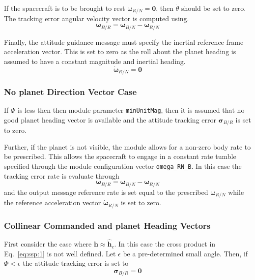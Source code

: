 If the spacecraft is to be brought to rest $\bm\omega_{R/N} = \bm 0$, then $\dot\theta$ should be set to zero.  The tracking error angular velocity vector is computed using.
\begin{equation}
	\label{eq:ssp:4}
	\bm\omega_{B/R} = \bm\omega_{B/N} - \bm\omega_{R/N}
\end{equation}

Finally, the attitude guidance message must specify the inertial reference frame  acceleration vector.  This is set to zero as the roll about the planet heading is assumed to have a constant magnitude and inertial heading.
\begin{equation}
	\dot{\bm \omega}_{R/N} = \bm 0
\end{equation}

\subsubsection{No planet Direction Vector Case}
 If $\Phi$ is less then then module parameter {\tt minUnitMag}, then it is assumed that no good planet heading vector is available and the attitude tracking error $\bm\sigma_{B/R}$ is set to zero.   
 
 Further, if the planet is not visible, the module allows for a non-zero body rate to be prescribed.  This allows the spacecraft to engage in a constant rate tumble specified through the module configuration vector {\tt omega\_RN\_B}.  In this case the tracking error rate is evaluate through
 \begin{equation}
 	\label{eq:ssp:6}
	\bm\omega_{B/R} = \bm\omega_{B/N} - \bm\omega_{R/N}
 \end{equation}
 and the output message reference rate is set equal to the prescribed $\bm\omega_{R/N}$ while the reference acceleration vector $\dot{\bm \omega}_{R/N}$ is set to zero.

 
 \subsubsection{Collinear Commanded and planet Heading Vectors}
First consider the case where $\bm h \approx \hat{\bm h}_{c}$.  In this case the cross product in Eq.~\eqref{eq:ssp:1} is not well defined.  Let $\epsilon$ be a pre-determined small angle.  Then, if $\Phi < \epsilon$ the attitude tracking error is set to 
$$
	\bm\sigma_{B/R} = \bm 0
$$
 
